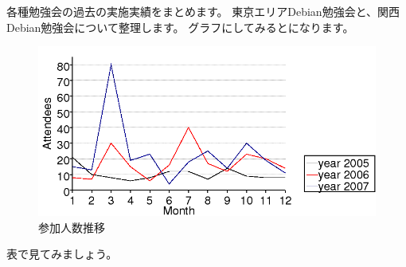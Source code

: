 \documentclass[mingoth,a4paper]{jsarticle}
\begin{document}
\label{sec:debmtg2007results}

各種勉強会の過去の実施実績をまとめます。
東京エリアDebian勉強会と、関西Debian勉強会について整理します。
グラフにしてみるとになります。
\begin{figure}[h]
 \begin{center}
  \includegraphics[width=12cm]{image200712/people-chart.png}
 \end{center}
\caption{参加人数推移}
\label{fig:peoplechart}
\end{figure}

表で見てみましょう。
 
\end{document}
